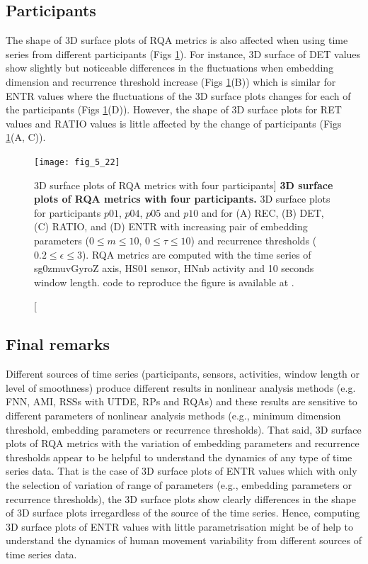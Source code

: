 \subsection{Participants}
The shape of 3D surface plots of RQA metrics is also affected when using 
time series from different participants (Figs \ref{fig:topo_participants_hii}).
For instance, 3D surface of DET values show slightly but noticeable 
differences in the fluctuations when embedding dimension and recurrence 
threshold increase (Figs \ref{fig:topo_participants_hii}(B)) which is similar 
for ENTR values where the fluctuations of the 3D surface plots changes for each 
of the participants (Figs \ref{fig:topo_participants_hii}(D)).
However, the shape of 3D surface plots for RET values and RATIO values 
is little affected by the change of participants 
(Figs \ref{fig:topo_participants_hii}(A, C)).

\begin{figure}
\centering
\texttt{[image: fig\_5\_22]}
    \caption
	[3D surface plots of RQA metrics with four participants]{
	{\bf 3D surface plots of RQA metrics with four participants.}
	3D surface plots for participants $p01$, $p04$, $p05$ and $p10$
	and for (A) REC, (B) DET, (C) RATIO, and (D) ENTR 
	with increasing pair of embedding parameters 
	($0 \le m \le 10$, $0 \le \tau \le 10$) 
	and recurrence thresholds ($ 0.2 \le \epsilon \le 3 $).
	RQA metrics are computed with the time series of
	sg0zmuvGyroZ axis, HS01 sensor, HNnb activity and 
	10 seconds window length.
	\R code to reproduce the figure is available at 
	.
 }
\label{fig:topo_participants_hii}
\end{figure}

\newpage
\subsection{Final remarks}
Different sources of time series (participants, sensors, 
activities, window length or level of smoothness) produce different
results in nonlinear analysis methods 
(e.g. FNN, AMI, RSSs with UTDE, RPs and RQAs) 
and these results are sensitive 
to different parameters of nonlinear analysis
methods (e.g., minimum dimension threshold, 
embedding parameters or recurrence thresholds).
That said, 3D surface plots of RQA metrics with the 
variation of embedding parameters and recurrence thresholds
appear to be helpful to understand the dynamics of 
any type of time series data.
That is the case of 3D surface plots of ENTR values which with 
only the selection of variation of range of parameters
(e.g., embedding parameters or recurrence thresholds),
the 3D surface plots show clearly differences in the shape 
of 3D surface plots irregardless of the source of the time series. 
Hence, computing 3D surface plots of ENTR values
with little parametrisation might be of help to understand 
the dynamics of human movement variability from different
sources of time series data.


